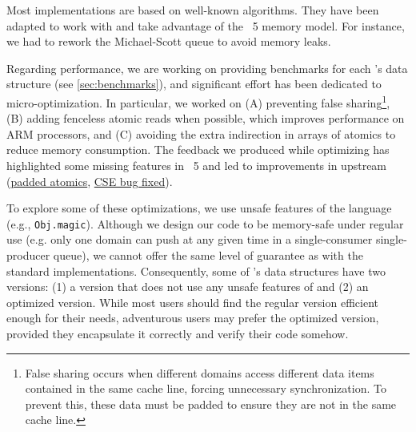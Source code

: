 \documentclass[a4paper, 11pt]{article}
\begin{document}
Most implementations are based on well-known algorithms.
They have been adapted to work with and take advantage of the \OCaml~5 memory model.
For instance, we had to rework the Michael-Scott queue to avoid memory leaks.

Regarding performance, we are working on providing benchmarks for each \Saturn's data structure (see \cref{sec:benchmarks}), and significant effort has been dedicated to micro-optimization. In particular, we worked on
(A) preventing false sharing\footnote{False sharing occurs when different domains access different data items contained in the same cache line, forcing unnecessary synchronization. To prevent this, these data must be padded to ensure they are not in the same cache line.},
(B) adding fenceless atomic reads when possible, which improves performance on ARM processors, and
(C) avoiding the extra indirection in arrays of atomics to reduce memory consumption.
The feedback we produced while optimizing \Saturn has highlighted some missing features in \OCaml~5 and led to improvements in upstream \OCaml (\href{https://github.com/ocaml/ocaml/pull/12212}{padded atomics}, \href{https://github.com/ocaml/ocaml/pull/12715}{CSE bug fixed}).

To explore some of these optimizations, we use unsafe features of the language (e.g., \texttt{Obj.magic}). Although we design our code to be memory-safe under regular use (e.g. only one domain can push at any given time in a single-consumer single-producer queue), we cannot offer the same level of guarantee as with the standard implementations. Consequently, some of \Saturn's data structures have two versions: (1) a version that does not use any unsafe features of \OCaml and (2) an optimized version. While most users should find the regular version efficient enough for their needs, adventurous users may prefer the optimized version, provided they encapsulate it correctly and verify their code somehow.


\end{document}

